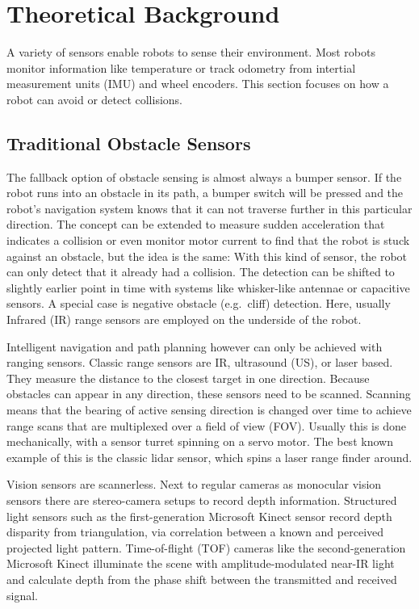 
\chapter{Theoretical Background}\label{theoretical-background}

A variety of sensors enable robots to sense their environment. Most
robots monitor information like temperature or track odometry from
intertial measurement units (IMU) and wheel encoders. This section
focuses on how a robot can avoid or detect collisions.

\section{Traditional Obstacle Sensors}\label{traditional-obstacle-sensors}

The fallback option of obstacle sensing is almost always a bumper
sensor. If the robot runs into an obstacle in its path, a bumper switch
will be pressed and the robot's navigation system knows that it can not
traverse further in this particular direction. The concept can be
extended to measure sudden acceleration that indicates a collision or
even monitor motor current to find that the robot is stuck against an
obstacle, but the idea is the same: With this kind of sensor, the robot
can only detect that it already had a collision. The detection can be
shifted to slightly earlier point in time with systems like whisker-like
antennae or capacitive sensors\cite{Muhlbacher-Karrer2015}. A special
case is negative obstacle (e.g.~cliff) detection. Here, usually Infrared
(IR) range sensors are employed on the underside of the robot.

Intelligent navigation and path planning however can only be achieved
with ranging sensors. Classic range sensors are IR, ultrasound (US), or
laser based. They measure the distance to the closest target in one
direction. Because obstacles can appear in any direction, these sensors
need to be scanned. Scanning means that the bearing of active sensing
direction is changed over time to achieve range scans that are
multiplexed over a field of view (FOV). Usually this is done
mechanically, with a sensor turret spinning on a servo motor. The best
known example of this is the classic lidar sensor, which spins a laser
range finder around.

Vision sensors are scannerless. Next to regular cameras as monocular
vision sensors there are stereo-camera setups to record depth
information. Structured light sensors such as the first-generation
Microsoft Kinect sensor record depth disparity from triangulation, via
correlation between a known and perceived projected light pattern.
Time-of-flight (TOF) cameras like the second-generation Microsoft Kinect
illuminate the scene with amplitude-modulated near-IR light and
calculate depth from the phase shift between the transmitted and
received signal\cite{Sarbolandi2015}.

